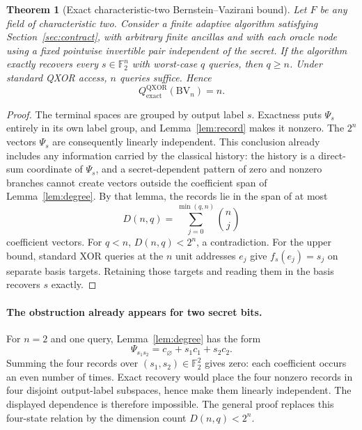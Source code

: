 \documentclass[11pt]{article}
\newtheorem{theorem}{Theorem}[section]
\newcommand{\F}{\mathbb F}
\begin{document}
\begin{theorem}[Exact characteristic-two Bernstein--Vazirani bound]\label{thm:bv}
Let $F$ be any field of characteristic two. Consider a finite adaptive algorithm satisfying Section~\ref{sec:contract}, with arbitrary finite ancillas and with each oracle node using a fixed pointwise invertible pair independent of the secret. If the algorithm exactly recovers every $s\in\F_2^n$ with worst-case $q$ queries, then $q\ge n$. Under standard QXOR access, $n$ queries suffice. Hence
\[
 Q_{\mathrm{exact}}^{\mathrm{QXOR}}(\mathrm{BV}_n)=n.
\]
\end{theorem}
\begin{proof}
The terminal spaces are grouped by output label $s$. Exactness puts $\Psi_s$ entirely in its own label group, and Lemma~\ref{lem:record} makes it nonzero. The $2^n$ vectors $\Psi_s$ are consequently linearly independent. This conclusion already includes any information carried by the classical history: the history is a direct-sum coordinate of $\Psi_s$, and a secret-dependent pattern of zero and nonzero branches cannot create vectors outside the coefficient span of Lemma~\ref{lem:degree}. By that lemma, the records lie in the span of at most
\[
 D(n,q)=\sum_{j=0}^{\min(q,n)}\binom nj
\]
coefficient vectors. For $q<n$, $D(n,q)<2^n$, a contradiction. For the upper bound, standard XOR queries at the $n$ unit addresses $e_j$ give $f_s(e_j)=s_j$ on separate basis targets. Retaining those targets and reading them in the basis recovers $s$ exactly.
\end{proof}

\paragraph{The obstruction already appears for two secret bits.}
For $n=2$ and one query, Lemma~\ref{lem:degree} has the form
\[
 \Psi_{s_1s_2}=c_\varnothing+s_1c_1+s_2c_2.
\]
Summing the four records over $(s_1,s_2)\in\F_2^2$ gives zero: each coefficient occurs an even number of times. Exact recovery would place the four nonzero records in four disjoint output-label subspaces, hence make them linearly independent. The displayed dependence is therefore impossible. The general proof replaces this four-state relation by the dimension count $D(n,q)<2^n$.
\end{document}
